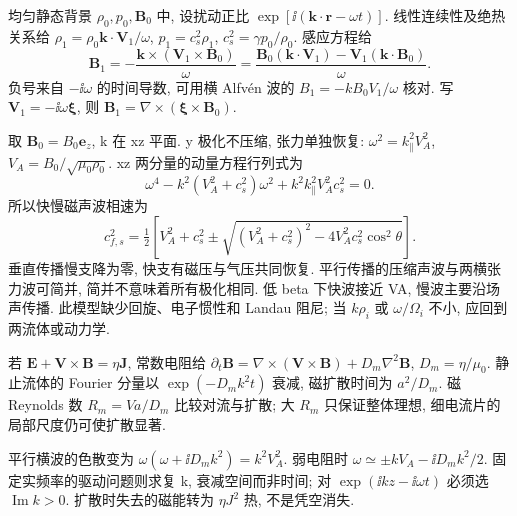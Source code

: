 \label{ch:mhdwaves}
均匀静态背景 $\rho_0,p_0,\mathbf B_0$ 中, 设扰动正比 $\exp[\ii(\mathbf k\cdot\mathbf r-\omega t)]$. 线性连续性及绝热关系给 $\rho_1=\rho_0\mathbf k\cdot\mathbf V_1/\omega$, $p_1=c_s^2\rho_1$, $c_s^2=\gamma p_0/\rho_0$. 感应方程给
\begin{equation}
 \mathbf B_1=-\frac{\mathbf k\times(\mathbf V_1\times\mathbf B_0)}\omega
 =\frac{\mathbf B_0(\mathbf k\cdot\mathbf V_1)-\mathbf V_1(\mathbf k\cdot\mathbf B_0)}\omega.
\end{equation}
负号来自 $-\ii\omega$ 的时间导数, 可用横 Alfv\'en 波的 $B_1=-kB_0V_1/\omega$ 核对. 写 $\mathbf V_1=-\ii\omega\boldsymbol\xi$, 则 $\mathbf B_1=\nabla\times(\boldsymbol\xi\times\mathbf B_0)$.

取 $\mathbf B_0=B_0\mathbf e_z$, k 在 xz 平面. y 极化不压缩, 张力单独恢复:
$\omega^2=k_\parallel^2V_A^2$, $V_A=B_0/\sqrt{\mu_0\rho_0}$. xz 两分量的动量方程行列式为
\begin{equation}
 \omega^4-k^2(V_A^2+c_s^2)\omega^2+k^2k_\parallel^2V_A^2c_s^2=0.
\end{equation}
所以快慢磁声波相速为
\begin{equation}
 c_{f,s}^2=\tfrac12\left[V_A^2+c_s^2\pm\sqrt{(V_A^2+c_s^2)^2-4V_A^2c_s^2\cos^2\theta}\right].
\end{equation}
垂直传播慢支降为零, 快支有磁压与气压共同恢复. 平行传播的压缩声波与两横张力波可简并, 简并不意味着所有极化相同. 低 beta 下快波接近 VA, 慢波主要沿场声传播. 此模型缺少回旋、电子惯性和 Landau 阻尼; 当 $k\rho_i$ 或 $\omega/\Omega_i$ 不小, 应回到两流体或动力学.

若 $\mathbf E+\mathbf V\times\mathbf B=\eta\mathbf J$, 常数电阻给
$\partial_t\mathbf B=\nabla\times(\mathbf V\times\mathbf B)+D_m\nabla^2\mathbf B$, $D_m=\eta/\mu_0$. 静止流体的 Fourier 分量以 $\exp(-D_mk^2t)$ 衰减, 磁扩散时间为 $a^2/D_m$. 磁 Reynolds 数 $R_m=Va/D_m$ 比较对流与扩散; 大 $R_m$ 只保证整体理想, 细电流片的局部尺度仍可使扩散显著.

平行横波的色散变为 $\omega(\omega+\ii D_mk^2)=k^2V_A^2$. 弱电阻时 $\omega\simeq\pm kV_A-\ii D_mk^2/2$. 固定实频率的驱动问题则求复 k, 衰减空间而非时间; 对 $\exp(\ii kz-\ii\omega t)$ 必须选 $\operatorname{Im}k>0$. 扩散时失去的磁能转为 $\eta J^2$ 热, 不是凭空消失.
